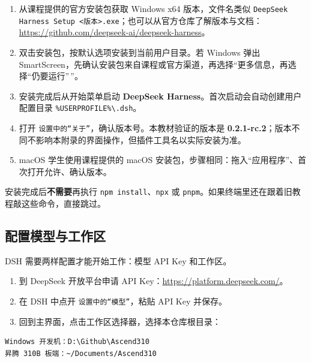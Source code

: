 \begin{enumerate}
\def\labelenumi{\arabic{enumi}.}
\tightlist
\item
  从课程提供的官方安装包获取 Windows x64 版本，文件名类似
  \passthrough{\lstinline!DeepSeek Harness Setup <版本>.exe!}；也可以从官方仓库了解版本与文档：\url{https://github.com/deepseek-ai/deepseek-harness}。
\item
  双击安装包，按默认选项安装到当前用户目录。若 Windows 弹出
  SmartScreen，先确认安装包来自课程或官方渠道，再选择``更多信息，再选择``仍要运行''\,''。
\item
  安装完成后从开始菜单启动 \textbf{DeepSeek
  Harness}。首次启动会自动创建用户配置目录
  \passthrough{\lstinline!\%USERPROFILE\%\\.dsh!}。
\item
  打开
  \passthrough{\lstinline!设置中的“关于”!}，确认版本号。本教材验证的版本是
  \textbf{0.2.1-rc.2}；版本不同不影响本附录的界面操作，但插件工具名以实际安装为准。
\item
  macOS 学生使用课程提供的 macOS
  安装包，步骤相同：拖入``应用程序''、首次打开允许、确认版本。
\end{enumerate}

安装完成后\textbf{不需要}再执行
\passthrough{\lstinline!npm install!}、\passthrough{\lstinline!npx!} 或
\passthrough{\lstinline!pnpm!}。如果终端里还在跟着旧教程敲这些命令，直接跳过。

\subsection{配置模型与工作区}\label{ux914dux7f6eux6a21ux578bux4e0eux5de5ux4f5cux533a}

DSH 需要两样配置才能开始工作：模型 API Key 和工作区。

\begin{enumerate}
\def\labelenumi{\arabic{enumi}.}
\tightlist
\item
  到 DeepSeek 开放平台申请 API
  Key：\url{https://platform.deepseek.com/}。
\item
  在 DSH 中点开 \passthrough{\lstinline!设置中的“模型”!}，粘贴 API Key
  并保存。
\item
  回到主界面，点击工作区选择器，选择本仓库根目录：
\end{enumerate}

\begin{lstlisting}
Windows 开发机：D:\Github\Ascend310
昇腾 310B 板端：~/Documents/Ascend310
\end{lstlisting}

